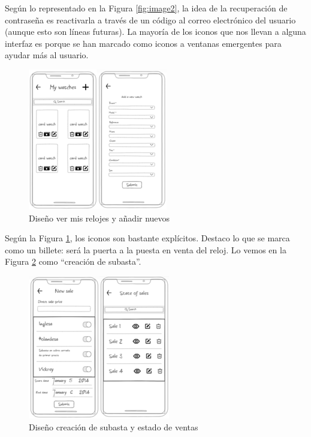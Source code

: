 	Según lo representado en la Figura \ref{fig:image2}, la idea de la recuperación de contraseña es reactivarla a través de un código al correo electrónico del usuario (aunque esto son líneas futuras). La mayoría de los iconos que nos llevan a alguna interfaz es porque se han marcado como iconos a ventanas emergentes para ayudar más al usuario.
	
\begin{figure}[H]
    \centering
    \includegraphics[width=0.6\linewidth]{img/image3.png}
    \caption{Diseño ver mis relojes y añadir nuevos}
    \label{fig:image3}
\end{figure}
	
	Según la Figura \ref{fig:image3}, los iconos son bastante explícitos. Destaco lo que se marca como un billete: será la puerta a la puesta en venta del reloj. Lo vemos en la Figura \ref{fig:image4} como ``creación de subasta''.
	
\begin{figure}[H]
    \centering
    \includegraphics[width=0.6\linewidth]{img/image4.png}
    \caption{Diseño creación de subasta y estado de ventas}
    \label{fig:image4}
\end{figure}

